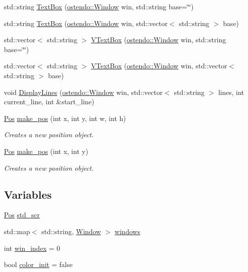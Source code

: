 \begin{DoxyCompactItemize}
std\+::string \hyperlink{namespaceostendo_a3d2c591339109330938a42d576c9e81d}{Text\+Box} (\hyperlink{classostendo_1_1Window}{ostendo\+::\+Window} win, std\+::string base=\char`\"{}\char`\"{})
\item 
std\+::string \hyperlink{namespaceostendo_a2f50af8d4996899c0906b9c78e045e84}{Text\+Box} (\hyperlink{classostendo_1_1Window}{ostendo\+::\+Window} win, std\+::vector$<$ std\+::string $>$ base)
\item 
std\+::vector$<$ std\+::string $>$ \hyperlink{namespaceostendo_a96fb1afad5e7a28a2c1f63066930683f}{V\+Text\+Box} (\hyperlink{classostendo_1_1Window}{ostendo\+::\+Window} win, std\+::string base=\char`\"{}\char`\"{})
\item 
std\+::vector$<$ std\+::string $>$ \hyperlink{namespaceostendo_ac2ce30296ad60b1e02258e3d5c1e8b4f}{V\+Text\+Box} (\hyperlink{classostendo_1_1Window}{ostendo\+::\+Window} win, std\+::vector$<$ std\+::string $>$ base)
\item 
void \hyperlink{namespaceostendo_a9bb1a56540aa7a03b6e8af5a347950d2}{Display\+Lines} (\hyperlink{classostendo_1_1Window}{ostendo\+::\+Window} win, std\+::vector$<$ std\+::string $>$ lines, int current\+\_\+line, int \&start\+\_\+line)
\item 
\hyperlink{structostendo_1_1Pos}{Pos} \hyperlink{namespaceostendo_a5703ea1e4f426c0216fc7f36708a4539}{make\+\_\+pos} (int x, int y, int w, int h)
\begin{DoxyCompactList}\small\item\em Creates a new position object. \end{DoxyCompactList}\item 
\hyperlink{structostendo_1_1Pos}{Pos} \hyperlink{namespaceostendo_a182badf5647b8bae4d48aa1e447b9d80}{make\+\_\+pos} (int x, int y)
\begin{DoxyCompactList}\small\item\em Creates a new position object. \end{DoxyCompactList}\end{DoxyCompactItemize}
\subsection*{Variables}
\begin{DoxyCompactItemize}
\item 
\hyperlink{structostendo_1_1Pos}{Pos} \hyperlink{namespaceostendo_a4c5850c8a109e159e874ecce8a5dc62a}{std\+\_\+scr}
\item 
std\+::map$<$ std\+::string, \hyperlink{classostendo_1_1Window}{Window} $>$ \hyperlink{namespaceostendo_ab45e3689aa0cb8a2e3a175c0aed97880}{windows}
\item 
int \hyperlink{namespaceostendo_a3267a8b4ac0d3934af4bf5f8079d0f72}{win\+\_\+index} = 0
\item 
bool \hyperlink{namespaceostendo_aaece4e9a0bcd75df4724bf97c628c12e}{color\+\_\+init} = false
\end{DoxyCompactItemize}


